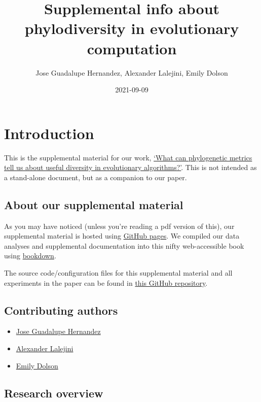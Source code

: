 \documentclass[]{book}
\title{Supplemental info about phylodiversity in evolutionary computation}
\author{Jose Guadalupe Hernandez, Alexander Lalejini, Emily Dolson}
\date{2021-09-09}
\providecommand{\tightlist}{%
  \setlength{\itemsep}{0pt}\setlength{\parskip}{0pt}}
\begin{document}
\maketitle

{
\setcounter{tocdepth}{1}
\tableofcontents
}
\hypertarget{introduction}{%
\chapter{Introduction}\label{introduction}}

This is the supplemental material for our work, \href{https://arxiv.org/abs/2108.12586}{`What can phylogenetic metrics tell us about useful diversity in evolutionary algorithms?'}.
This is not intended as a stand-alone document, but as a companion to our paper.

\hypertarget{about-our-supplemental-material}{%
\section{About our supplemental material}\label{about-our-supplemental-material}}

As you may have noticed (unless you're reading a pdf version of this), our supplemental material is hosted using \href{https://pages.github.com/}{GitHub pages}.
We compiled our data analyses and supplemental documentation into this nifty web-accessible book using \href{https://bookdown.org}{bookdown}.

The source code/configuration files for this supplemental material and all experiments in the paper can be found in \href{https://github.com/emilydolson/phylodiversity-metrics-in-EC-GPTP-2021}{this GitHub repository}.

\hypertarget{contributing-authors}{%
\section{Contributing authors}\label{contributing-authors}}

\begin{itemize}
\tightlist
\item
  \href{https://jgh9094.github.io/}{Jose Guadalupe Hernandez}
\item
  \href{https://lalejini.com/}{Alexander Lalejini}
\item
  \href{http://emilyldolson.com/}{Emily Dolson}
\end{itemize}

\hypertarget{research-overview}{%
\section{Research overview}\label{research-overview}}
\end{document}
